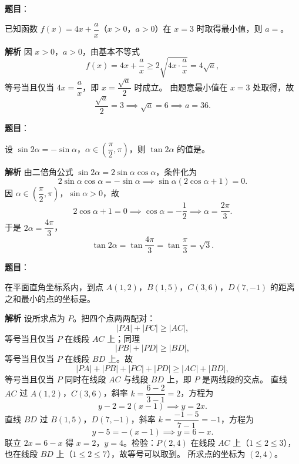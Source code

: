\begin{answer}

\textbf{题目}：

已知函数 $f(x)=4x+\dfrac ax$（$x>0$，$a>0$）在 $x=3$ 时取得最小值，则 $a=$\gkblank{}。

\textbf{解析}
因 $x>0$，$a>0$，由基本不等式
\nopagebreak[4]
\[f(x)=4x+\frac ax\geqslant2\sqrt{4x\cdot\frac ax}=4\sqrt a,\]
等号当且仅当 $4x=\dfrac ax$，即 $x=\dfrac{\sqrt a}2$ 时成立。
由题意最小值在 $x=3$ 处取得，故
\nopagebreak[4]
\[\frac{\sqrt a}2=3\implies\sqrt a=6\implies a=36.\]


\end{answer}
\begin{answer}

\textbf{题目}：

设 $\sin2\alpha=-\sin\alpha$，$\alpha\in\left(\dfrac\pi2,\pi\right)$，则 $\tan2\alpha$ 的值是\gkblank{}。

\textbf{解析}
由二倍角公式 $\sin2\alpha=2\sin\alpha\cos\alpha$，条件化为
\nopagebreak[4]
\[2\sin\alpha\cos\alpha=-\sin\alpha\implies\sin\alpha(2\cos\alpha+1)=0.\]
因 $\alpha\in\left(\dfrac\pi2,\pi\right)$，$\sin\alpha>0$，故
\nopagebreak[4]
\[2\cos\alpha+1=0\implies\cos\alpha=-\frac12\implies\alpha=\frac{2\pi}3.\]
于是 $2\alpha=\dfrac{4\pi}3$，
\nopagebreak[4]
\[\tan2\alpha=\tan\frac{4\pi}3=\tan\frac\pi3=\sqrt3.\]


\end{answer}
\begin{answer}

\textbf{题目}：

在平面直角坐标系内，到点 $A(1,2)$，$B(1,5)$，$C(3,6)$，$D(7,-1)$ 的距离之和最小的点的坐标是\gkblank{}。

\textbf{解析}
设所求点为 $P$。把四个点两两配对：
\nopagebreak[4]
\[|PA|+|PC|\geqslant|AC|,\]
等号当且仅当 $P$ 在线段 $AC$ 上；同理
\nopagebreak[4]
\[|PB|+|PD|\geqslant|BD|,\]
等号当且仅当 $P$ 在线段 $BD$ 上。故
\nopagebreak[4]
\[|PA|+|PB|+|PC|+|PD|\geqslant|AC|+|BD|,\]
等号当且仅当 $P$ 同时在线段 $AC$ 与线段 $BD$ 上，即 $P$ 是两线段的交点。
直线 $AC$ 过 $A(1,2)$，$C(3,6)$，斜率 $k=\dfrac{6-2}{3-1}=2$，方程为
\nopagebreak[4]
\[y-2=2(x-1)\implies y=2x.\]
直线 $BD$ 过 $B(1,5)$，$D(7,-1)$，斜率 $k=\dfrac{-1-5}{7-1}=-1$，方程为
\nopagebreak[4]
\[y-5=-(x-1)\implies y=6-x.\]
联立 $2x=6-x$ 得 $x=2$，$y=4$。检验：$P(2,4)$ 在线段 $AC$ 上（$1\leqslant2\leqslant3$），也在线段 $BD$ 上（$1\leqslant2\leqslant7$），故等号可以取到。
所求点的坐标为 $(2,4)$。


\end{answer}
